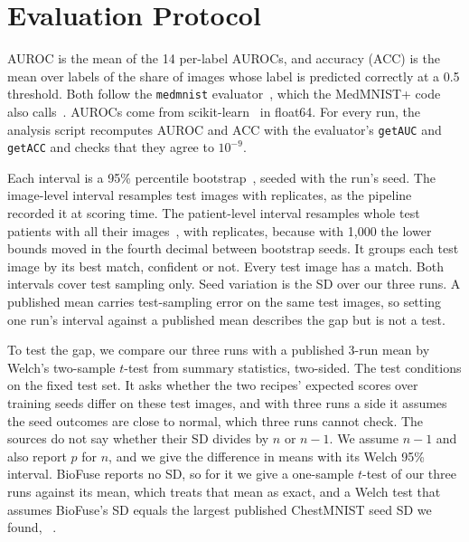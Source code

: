 \documentclass[conference]{IEEEtran}
\newif\ifanycitation
\let\citeAnyKey\cite
\renewcommand{\cite}{\global\anycitationtrue\citeAnyKey}
\begin{document}
\section{Evaluation Protocol}
\label{sec:protocol}

AUROC is the mean of the 14 per-label AUROCs, and accuracy (ACC) is the mean over labels
of the share of images whose label is predicted correctly at a 0.5 threshold. Both follow
the \texttt{medmnist} evaluator~\cite{medmnist2024evaluator}, which the MedMNIST+ code also
calls~\cite{doerrich2024code}. AUROCs come from scikit-learn~\cite{pedregosa2011sklearn} in
float64. For every run, the analysis script recomputes AUROC and ACC with the evaluator's
\texttt{getAUC} and \texttt{getACC} and checks that they agree to $10^{-9}$.

Each interval is a 95\% percentile bootstrap~\cite{efron1979bootstrap,efron1986bootstrap},
seeded with the run's seed. The image-level interval resamples test images with
\bootReplicates{} replicates, as the pipeline recorded it at scoring time. The
patient-level interval resamples whole test patients with all their
images~\cite{field2007bootstrap}, with \patientReplicates{} replicates, because with
1,000 the lower bounds moved in the fourth decimal between bootstrap seeds. It groups
each test image by its best match, confident or not. Every test image has a match. Both intervals cover test sampling only. Seed
variation is the SD over our three runs. A published mean carries test-sampling error on
the same test images, so setting one run's interval against a published mean describes
the gap but is not a test.

To test the gap, we compare our three runs with a published 3-run mean by Welch's
two-sample $t$-test from summary statistics, two-sided. The test conditions on the fixed
test set. It asks whether the two recipes' expected scores over training seeds differ on
these test images, and with three runs a side it assumes the seed outcomes are close to
normal, which three runs cannot check. The sources do not say whether their SD divides by
$n$ or $n-1$. We assume $n-1$ and also report $p$ for $n$, and we give the difference in means with its
Welch 95\% interval. BioFuse reports no SD, so for
it we give a one-sample $t$-test of our three runs against its mean, which treats that
mean as exact, and a Welch test that assumes BioFuse's SD equals the largest published
ChestMNIST seed SD we found, \baseWuSD{}~\cite{wu2025rethinking}.
\end{document}
